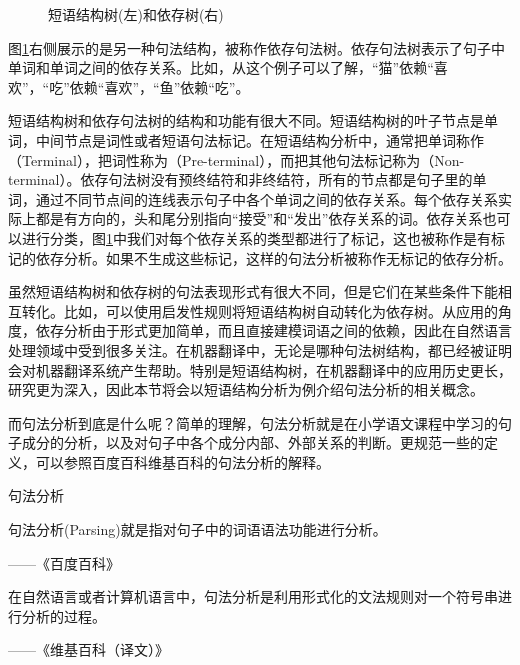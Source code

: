 \begin{figure}[htp]
    \centering

    \caption{短语结构树(左)和依存树(右)}
    \label{fig:2-20}
\end{figure}

\parinterval 图\ref{fig:2-20}右侧展示的是另一种句法结构，被称作依存句法树。依存句法树表示了句子中单词和单词之间的依存关系。比如，从这个例子可以了解，``猫''依赖``喜欢''，``吃''依赖``喜欢''，``鱼''依赖``吃''。

\parinterval 短语结构树和依存句法树的结构和功能有很大不同。短语结构树的叶子节点是单词，中间节点是词性或者短语句法标记。在短语结构分析中，通常把单词称作{\small{}}（Terminal），把词性称为{\small{}}（Pre-terminal），而把其他句法标记称为{\small{}}（Non-terminal）。依存句法树没有预终结符和非终结符，所有的节点都是句子里的单词，通过不同节点间的连线表示句子中各个单词之间的依存关系。每个依存关系实际上都是有方向的，头和尾分别指向``接受''和``发出''依存关系的词。依存关系也可以进行分类，图\ref{fig:2-20}中我们对每个依存关系的类型都进行了标记，这也被称作是有标记的依存分析。如果不生成这些标记，这样的句法分析被称作无标记的依存分析。

\parinterval 虽然短语结构树和依存树的句法表现形式有很大不同，但是它们在某些条件下能相互转化。比如，可以使用启发性规则将短语结构树自动转化为依存树。从应用的角度，依存分析由于形式更加简单，而且直接建模词语之间的依赖，因此在自然语言处理领域中受到很多关注。在机器翻译中，无论是哪种句法树结构，都已经被证明会对机器翻译系统产生帮助。特别是短语结构树，在机器翻译中的应用历史更长，研究更为深入，因此本节将会以短语结构分析为例介绍句法分析的相关概念。

\parinterval 而句法分析到底是什么呢？简单的理解，句法分析就是在小学语文课程中学习的句子成分的分析，以及对句子中各个成分内部、外部关系的判断。更规范一些的定义，可以参照百度百科维基百科的句法分析的解释。

\vspace{-0.0em}
\begin{definition} 句法分析

句法分析(Parsing)就是指对句子中的词语语法功能进行分析。
\begin{flushright}——《百度百科》\end{flushright}

在自然语言或者计算机语言中，句法分析是利用形式化的文法规则对一个符号串进行分析的过程。
\begin{flushright}——《维基百科（译文）》\end{flushright}
\end{definition}

